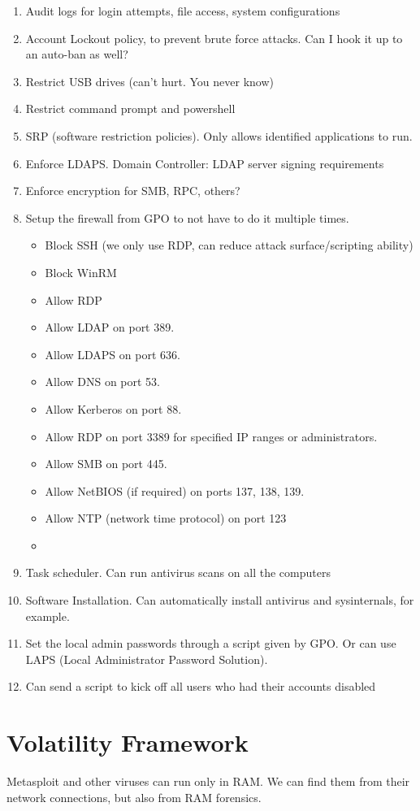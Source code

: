 \documentclass{article}
\begin{document}
\begin{enumerate}
    \item Audit logs for login attempts, file access, system configurations
    \item Account Lockout policy, to prevent brute force attacks. Can I hook it up to an auto-ban as well?
    \item Restrict USB drives (can't hurt. You never know)
    \item Restrict command prompt and powershell
    \item SRP (software restriction policies). Only allows identified applications to run.
    \item Enforce LDAPS. Domain Controller: LDAP server signing requirements
    \item Enforce encryption for SMB, RPC, others?
    \item Setup the firewall from GPO to not have to do it multiple times.
    \begin{itemize}
        \item Block SSH (we only use RDP, can reduce attack surface/scripting ability)
        \item Block WinRM
        \item Allow RDP
        \item Allow LDAP on port 389.
        \item Allow LDAPS on port 636.
        \item Allow DNS on port 53.
        \item Allow Kerberos on port 88.
        \item Allow RDP on port 3389 for specified IP ranges or administrators.
        \item Allow SMB on port 445.
        \item Allow NetBIOS (if required) on ports 137, 138, 139.
        \item Allow NTP (network time protocol) on port 123
        \item 
    \end{itemize}
    \item Task scheduler. Can run antivirus scans on all the computers
    \item Software Installation. Can automatically install antivirus and sysinternals, for example.
    \item Set the local admin passwords through a script given by GPO. Or can use LAPS (Local Administrator Password Solution).
    \item Can send a script to kick off all users who had their accounts disabled
\end{enumerate}

\section{Volatility Framework}
Metasploit and other viruses can run only in RAM. 
We can find them from their network connections, but also from 
RAM forensics.

\end{document}
